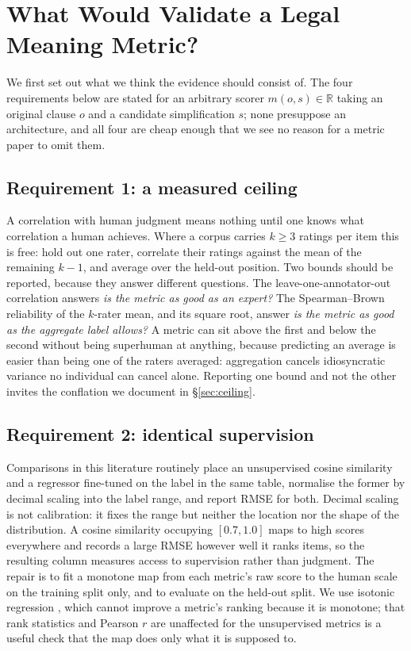 \documentclass[11pt]{article}
\begin{document}
\section{What Would Validate a Legal Meaning Metric?}
\label{sec:protocol}

We first set out what we think the evidence should consist of. The four
requirements below are stated for an arbitrary scorer $m(o,s) \in \mathbb{R}$
taking an original clause $o$ and a candidate simplification $s$; none
presuppose an architecture, and all four are cheap enough that we see no reason
for a metric paper to omit them.

\subsection{Requirement 1: a measured ceiling}

A correlation with human judgment means nothing until one knows what correlation
a human achieves. Where a corpus carries $k \geq 3$ ratings per item this is
free: hold out one rater, correlate their ratings against the mean of the
remaining $k-1$, and average over the held-out position. Two bounds should be
reported, because they answer different questions. The leave-one-annotator-out
correlation answers \emph{is the metric as good as an expert?} The
Spearman--Brown reliability of the $k$-rater mean, and its square root, answer
\emph{is the metric as good as the aggregate label allows?} A metric can sit above the first and below
the second without being superhuman at anything, because predicting an average
is easier than being one of the raters averaged: aggregation cancels
idiosyncratic variance no individual can cancel alone. Reporting one bound and
not the other invites the conflation we document in \S\ref{sec:ceiling}.

\subsection{Requirement 2: identical supervision}

Comparisons in this literature routinely place an unsupervised cosine similarity
and a regressor fine-tuned on the label in the same table, normalise the former
by decimal scaling into the label range, and report RMSE for both. Decimal
scaling is not calibration: it fixes the range but neither the location nor the
shape of the distribution. A cosine similarity occupying $[0.7,1.0]$ maps to
high scores everywhere and records a large RMSE however well it ranks items, so
the resulting column measures access to supervision rather than judgment. The
repair is to fit a monotone map from each metric's raw score to the human scale
on the training split only, and to evaluate on the held-out split. We use
isotonic regression \citep{zadrozny2002transforming}, which cannot improve a
metric's ranking because it is monotone; that rank statistics and Pearson $r$
are unaffected for the unsupervised metrics is a useful check that the map does
only what it is supposed to.
\end{document}
